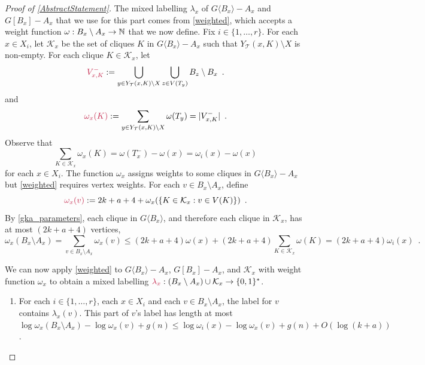 \documentclass{patmorin}
\makeatletter
\newcommand{\torso}[2]{{#1}\langle{#2}\rangle}
\renewcommand{\le}{\leqslant}
\def\mathcolor#1#{\@mathcolor{#1}}
\def\@mathcolor#1#2#3{%
  \protect\leavevmode
  \begingroup
    \color#1{#2}#3%
  \endgroup
}
\newcommand{\mathdefin}[1]{\mathcolor{brightmaroon}{#1}}
\makeatother
\begin{document}
\begin{proof}[Proof of \cref{AbstractStatement}]
    The mixed labelling $\lambda_x$ of $\torso{G}{B_x}-A_x$ and $G[B_x]-A_x$ that we use for this part comes from \cref{weighted}, which accepts a weight function $\omega:B_x\setminus A_x\to\mathbb{N}$ that we now define.
    Fix $i\in\{1,\ldots,r\}$. For each $x\in X_i$, let $\mathcal{K}_x$ be the set of cliques $K$ in $\torso{G}{B_x}-A_x$ such that $Y_\mathcal{T}(x,K)\setminus X$ is non-empty.  For each clique $K\in\mathcal{K}_x$, let
    \[
      \mathdefin{V^-_{x,K}}:=\bigcup_{y\in Y_\mathcal{T}(x,K)\setminus X}\bigcup_{z\in V(T_y)}B_z\setminus B_x \enspace .
    \]
    and
    \[
      \mathdefin{\omega_x(K)}:=\sum_{y\in Y_\mathcal{T}(x,K)\setminus X}\omega(T_{y})=|V^-_{x,K}| \enspace .
    \]
    Observe that
    \[
       \sum_{K\in\mathcal{K}_x}\omega_x(K) =
       \omega(T^-_x)-\omega(x) = \omega_i(x)-\omega(x)
    \]
    for each $x\in X_i$.
    The function $\omega_x$ assigns weights to some cliques in $\torso{G}{B_x}-A_x$ but \cref{weighted} requires vertex weights. For each $v\in B_x\setminus A_x$, define
    \[
      \mathdefin{\omega_x(v)} := 2k+a+4+\omega_x(\{K\in\mathcal{K}_x:v\in V(K)\}) \enspace .
    \]
    By \cref{gka_parameters}, each clique in $\torso{G}{B_x}$, and therefore each clique in $\mathcal{K}_x$, has at most $(2k+a+4)$ vertices,
    \[
      \omega_x(B_x\setminus A_x)=\sum_{v\in B_x\setminus A_x}\omega_x(v)\le (2k+a+4)\omega(x) + (2k+a+4)\sum_{K\in \mathcal{K}_x}\omega(K)
        = (2k+a+4)\omega_i(x) \enspace .
    \]

    We can now apply \cref{weighted} to $\torso{G}{B_x}-A_x$, $G[B_x]-A_x$, and $\mathcal{K}_x$ with weight function $\omega_x$ to obtain a mixed labelling $\mathdefin{\lambda_x}:(B_x\setminus A_x)\cup \mathcal{K}_x\to\{0,1\}^*$.


    \begin{enumerate}[nosep,nolistsep,label=(P6\alph*)]
      \item\label{dejmmw_part}\label{dejmmw_part_vertex} For each $i\in\{1,\ldots,r\}$, each $x\in X_i$ and each $v\in B_x\setminus A_x$, the label for $v$ contains $\lambda_x(v)$. This part of $v$'s label has length at most $\log \omega_x(B_x\setminus A_x)-\log\omega_x(v)+g(n)\le \log\omega_i(x)-\log\omega_x(v)+g(n)+O(\log(k+a))$.


\end{enumerate}
\end{proof}
\end{document}

